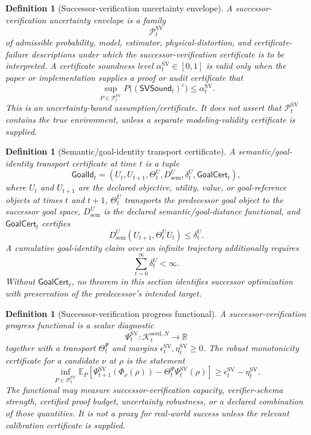 \documentclass[11pt]{article}
\newtheorem{definition}[theorem]{Definition}
\newcommand{\Pcal}{\mathcal{P}}
\newcommand{\1}{\mathbf{1}}
\providecommand{\Kcal}{\mathcal{K}}
\providecommand{\sem}{\mathrm{sem}}
\begin{document}
\begin{definition}[Successor-verification uncertainty envelope]
\label{def:batch12_sv_uncertainty_envelope}
A successor-verification uncertainty envelope is a family
\[
\Pcal_t^{\mathrm{SV}}
\]
of admissible probability, model, estimator, physical-distortion, and certificate-failure descriptions under which the successor-verification certificate is to be interpreted.  A certificate soundness level \(\alpha_t^{\mathrm{SV}}\in[0,1]\) is valid only when the paper or implementation supplies a proof or audit certificate that
\[
\sup_{P\in\Pcal_t^{\mathrm{SV}}}
P\bigl((\mathsf{SVSound}_t)^c\bigr)
\le
\alpha_t^{\mathrm{SV}}.
\]
This is an uncertainty-bound assumption/certificate.  It does not assert that \(\Pcal_t^{\mathrm{SV}}\) contains the true environment, unless a separate modeling-validity certificate is supplied.
\end{definition}

\begin{definition}[Semantic/goal-identity transport certificate]
\label{def:batch12_goal_identity_transport_certificate}
A semantic/goal-identity transport certificate at time \(t\) is a tuple
\[
\mathsf{GoalId}_t
=
(U_t,U_{t+1},\Theta_t^U,D_{\sem}^U,\delta_t^U,\mathsf{GoalCert}_t),
\]
where \(U_t\) and \(U_{t+1}\) are the declared objective, utility, value, or goal-reference objects at times \(t\) and \(t+1\), \(\Theta_t^U\) transports the predecessor goal object to the successor goal space, \(D_{\sem}^U\) is the declared semantic/goal-distance functional, and \(\mathsf{GoalCert}_t\) certifies
\[
D_{\sem}^U(U_{t+1},\Theta_t^U U_t)
\le
\delta_t^U.
\]
A cumulative goal-identity claim over an infinite trajectory additionally requires
\[
\sum_{t=0}^{\infty}\delta_t^U<\infty.
\]
Without \(\mathsf{GoalCert}_t\), no theorem in this section identifies successor optimization with preservation of the predecessor's intended target.
\end{definition}

\begin{definition}[Successor-verification progress functional]
\label{def:batch12_sv_progress_functional}
A successor-verification progress functional is a scalar diagnostic
\[
\Psi_t^{\mathrm{SV}}:\Kcal_t^{\mathrm{seed},N}\to\mathbb R
\]
together with a transport \(\Theta_t^\Psi\) and margins \(\epsilon_t^{\mathrm{SV}},\eta_t^{\mathrm{SV}}\ge0\).  The robust monotonicity certificate for a candidate \(\nu\) at \(\rho\) is the statement
\[
\inf_{P\in\Pcal_t^{\mathrm{SV}}}
\mathbb E_P
\left[
\Psi_{t+1}^{\mathrm{SV}}(\Phi_\nu(\rho))
-
\Theta_t^\Psi\Psi_t^{\mathrm{SV}}(\rho)
\right]
\ge
\epsilon_t^{\mathrm{SV}}-
\eta_t^{\mathrm{SV}}.
\]
The functional may measure successor-verification capacity, verifier-schema strength, certified proof budget, uncertainty robustness, or a declared combination of those quantities.  It is not a proxy for real-world success unless the relevant calibration certificate is supplied.
\end{definition}
\end{document}
